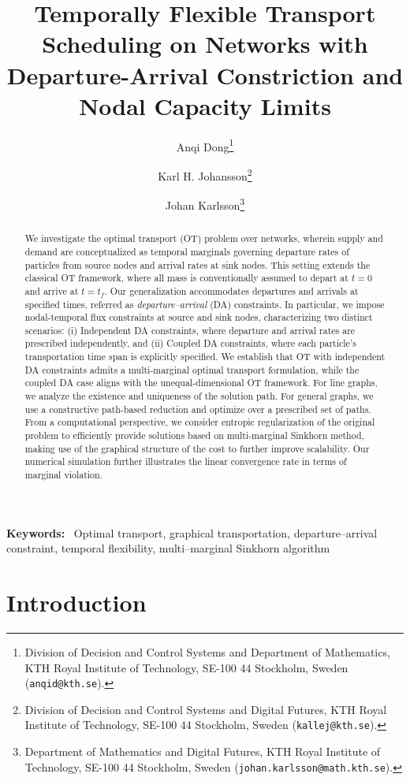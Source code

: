 \documentclass[11pt]{article}
\title{\Large \bfseries Temporally Flexible Transport Scheduling on Networks with Departure-Arrival Constriction and Nodal Capacity Limits}
\author{%
Anqi Dong\thanks{Division of Decision and Control Systems and Department of Mathematics, KTH Royal Institute of Technology, SE-100 44 Stockholm, Sweden (\texttt{anqid@kth.se}).}%
\and Karl H. Johansson\thanks{Division of Decision and Control Systems and Digital Futures, KTH Royal Institute of Technology, SE-100 44 Stockholm, Sweden (\texttt{kallej@kth.se}).}%
\and Johan Karlsson\thanks{Department of Mathematics and Digital Futures, KTH Royal Institute of Technology, SE-100 44 Stockholm, Sweden (\texttt{johan.karlsson@math.kth.se}).}%
}
\newenvironment{keywords}{%
\vspace{1ex}\noindent\small
\textbf{Keywords:}\ }%
{\par\vspace{1ex}}
\begin{document}
\maketitle
                        

                                     
\begin{abstract}
We investigate the optimal transport (OT) problem over networks, wherein supply and demand are conceptualized as temporal marginals governing departure rates of particles from source nodes and arrival rates at sink nodes. This setting extends the classical OT framework, where all mass is conventionally assumed to depart at $t = 0$ and arrive at $t = t_f$. Our generalization accommodates departures and arrivals at specified times, referred as \emph{departure--arrival} (DA) constraints. In particular, we impose nodal-temporal flux constraints at source and sink nodes, characterizing two distinct scenarios: (i) Independent DA constraints, where departure and arrival rates are prescribed independently, and (ii) Coupled DA constraints, where each particle’s transportation time span is explicitly specified. We establish that OT with independent DA constraints admits a multi-marginal optimal transport formulation, while the coupled DA case aligns with the unequal-dimensional OT framework. For line graphs, we analyze the existence and uniqueness of the solution path. For general graphs, we use a constructive path-based reduction and optimize over a prescribed set of paths.  From a computational perspective, we consider entropic regularization of the original problem to efficiently provide solutions based on multi-marginal Sinkhorn method, making use of the graphical structure of the cost to further improve scalability. Our numerical simulation further illustrates the linear convergence rate in terms of marginal violation. 
\end{abstract}


\begin{keywords}                                
Optimal transport, graphical transportation, departure--arrival constraint, temporal flexibility, multi--marginal Sinkhorn algorithm
\end{keywords}    



\section{Introduction}
\end{document}
